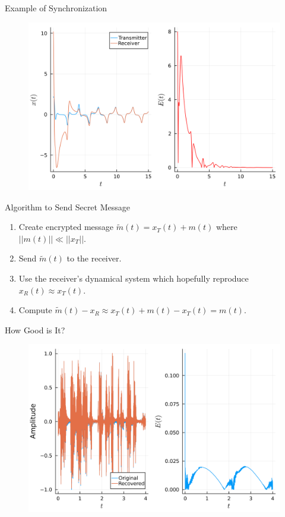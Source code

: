 \documentclass{beamer}
\begin{document}
\begin{frame}{Example of Synchronization}
    \begin{figure}[H]
        \includegraphics[width=\linewidth,height=\textheight,keepaspectratio]{combined_plot.png}
        \centering
    \end{figure}
\end{frame}


\begin{frame}{Algorithm to Send Secret Message}
    \begin{enumerate}
        \item Create encrypted message $\widetilde{m}(t) = x_T (t) + m(t)$ where $||m(t)|| \ll ||x_T||$. 
        \item Send $\widetilde{m}(t)$ to the receiver. 
        \item Use the receiver's dynamical system which hopefully reproduce $x_R(t) \approx x_T(t)$. 
        \item Compute $\widetilde{m}(t) - x_R \approx x_T (t) + m(t) - x_T(t) = m(t)$. 
    \end{enumerate}
\end{frame}

\begin{frame}{How Good is It?}
    \begin{figure}[H]
        \includegraphics[width=\linewidth,height=\textheight,keepaspectratio]{combined_error_sound_plot.png}
        \centering
    \end{figure}
\end{frame}
\end{document}
